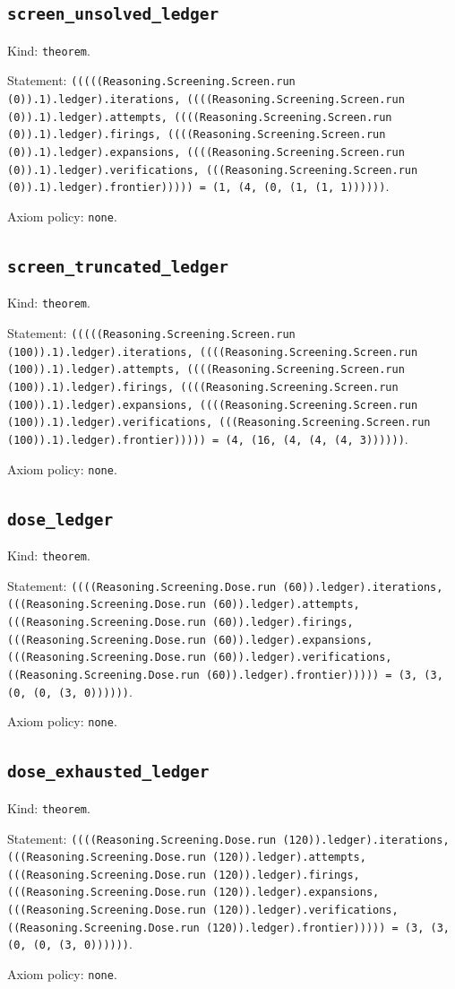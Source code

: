 \documentclass[11pt]{article}
\begin{document}
\subsection*{\texttt{screen\_unsolved\_ledger}}
\noindent Kind: \texttt{theorem}.\par
\noindent Statement: \texttt{(((((Reasoning.Screening.Screen.run (0)).1).ledger).iterations, ((((Reasoning.Screening.Screen.run (0)).1).ledger).attempts, ((((Reasoning.Screening.Screen.run (0)).1).ledger).firings, ((((Reasoning.Screening.Screen.run (0)).1).ledger).expansions, ((((Reasoning.Screening.Screen.run (0)).1).ledger).verifications, (((Reasoning.Screening.Screen.run (0)).1).ledger).frontier))))) = (1, (4, (0, (1, (1, 1))))))}.\par
\noindent Axiom policy: \texttt{none}.\par
\subsection*{\texttt{screen\_truncated\_ledger}}
\noindent Kind: \texttt{theorem}.\par
\noindent Statement: \texttt{(((((Reasoning.Screening.Screen.run (100)).1).ledger).iterations, ((((Reasoning.Screening.Screen.run (100)).1).ledger).attempts, ((((Reasoning.Screening.Screen.run (100)).1).ledger).firings, ((((Reasoning.Screening.Screen.run (100)).1).ledger).expansions, ((((Reasoning.Screening.Screen.run (100)).1).ledger).verifications, (((Reasoning.Screening.Screen.run (100)).1).ledger).frontier))))) = (4, (16, (4, (4, (4, 3))))))}.\par
\noindent Axiom policy: \texttt{none}.\par
\subsection*{\texttt{dose\_ledger}}
\noindent Kind: \texttt{theorem}.\par
\noindent Statement: \texttt{((((Reasoning.Screening.Dose.run (60)).ledger).iterations, (((Reasoning.Screening.Dose.run (60)).ledger).attempts, (((Reasoning.Screening.Dose.run (60)).ledger).firings, (((Reasoning.Screening.Dose.run (60)).ledger).expansions, (((Reasoning.Screening.Dose.run (60)).ledger).verifications, ((Reasoning.Screening.Dose.run (60)).ledger).frontier))))) = (3, (3, (0, (0, (3, 0))))))}.\par
\noindent Axiom policy: \texttt{none}.\par
\subsection*{\texttt{dose\_exhausted\_ledger}}
\noindent Kind: \texttt{theorem}.\par
\noindent Statement: \texttt{((((Reasoning.Screening.Dose.run (120)).ledger).iterations, (((Reasoning.Screening.Dose.run (120)).ledger).attempts, (((Reasoning.Screening.Dose.run (120)).ledger).firings, (((Reasoning.Screening.Dose.run (120)).ledger).expansions, (((Reasoning.Screening.Dose.run (120)).ledger).verifications, ((Reasoning.Screening.Dose.run (120)).ledger).frontier))))) = (3, (3, (0, (0, (3, 0))))))}.\par
\noindent Axiom policy: \texttt{none}.\par
\end{document}
